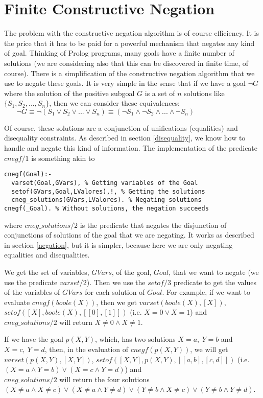\documentclass{tlp}
\begin{document}
\section{Finite Constructive Negation}
\label{cnegf}

The problem with the constructive negation algorithm is of course
efficiency. It is the price that it has to be paid for a powerful
mechanism that negates any kind of goal. Thinking of Prolog programs,
many goals have a finite number of solutions (we are considering also
that this can be discovered in finite time, of course). There is a
simplification of the constructive negation algorithm that we use to
negate these goals. It is very simple in the sense that if we have a
goal $\neg G$ where the solution of the positive subgoal $G$ is a set
of $n$ solutions like $\{S_1, S_2,...,S_n\}$, then we can consider
these equivalences: %
$~~~~~~~~\neg G \equiv \neg(S_1 \vee S_2 \vee ... \vee S_n) 
 \equiv (\neg S_1 \wedge \neg S_2 \wedge ... \wedge \neg S_n)$

Of course, these solutions are a conjunction of unifications
(equalities) and disequality constraints. As described in section
\ref{disequality}, we know how to handle and negate this kind of
information. The implementation of the predicate $cnegf/1$ is
something akin to

{\small
\begin{verbatim}
cnegf(Goal):-
  varset(Goal,GVars), % Getting variables of the Goal
  setof(GVars,Goal,LValores),!, % Getting the solutions
  cneg_solutions(GVars,LValores). % Negating solutions
cnegf(_Goal). % Without solutions, the negation succeeds
\end{verbatim}
}
\noindent
where $cneg\_solutions/2$ is the predicate that negates the disjunction
of conjunctions of solutions of the goal that we are negating. It
works as described in section \ref{negation}, but it is simpler,
because here we are only negating equalities and disequalities.

We get the set of variables, $GVars$, of the goal, $Goal$, that we
want to negate (we use the predicate $varset/2$). Then we use the
$setof/3$ predicate to get the values of the variables of $GVars$
 for each solution of $Goal$. For example, if we want to
evaluate $cnegf(boole(X))$, then we get $varset(boole(X),[X])$,
$setof([X],boole(X),[[0],[1]])$ (i.e. $X=0 \vee X=1$) and
$cneg\_solutions/2$ will return $X \neq 0
\wedge X \neq 1$. 

If we have the goal $p(X,Y)$, which, has two solutions $X=a,~Y=b$ and
$X=c,~Y=d$, then, in the evaluation of $cnegf(p(X,Y))$, we will get
$varset(p(X,Y),[X,Y])$, $setof([X,Y],p(X,Y),[[a,b],[c,d]])$
(i.e. $(X=a \wedge Y=b) \vee (X=c \wedge Y=d)$) and \\$cneg\_solutions/2$
will return the four solutions $(X \neq a \wedge X \neq c) \vee (X
\neq a \wedge Y \neq d) \vee (Y \neq b \wedge X \neq c) \vee (Y \neq b
\wedge Y \neq d)$.
\end{document}
